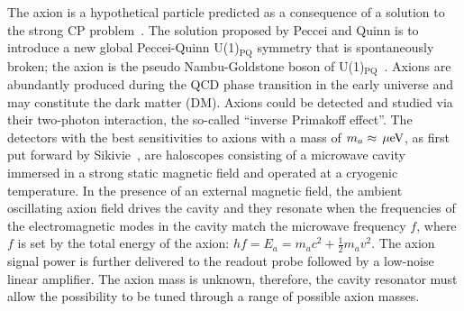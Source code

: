 \documentclass[%
 reprint,prl, %
 amsmath,amssymb,
 aps,
]{revtex4-2}
\newcommand{\ma}{\ensuremath{m_a}}
\newcommand{\muevcc}{\ensuremath{\,\mu\text{e\hspace{-.08em}V}}}
\begin{document}
The axion is a hypothetical particle predicted as a consequence of a  
solution to the strong CP problem~\cite{strongCPI,strongCPII,strongCPIII}. 
The solution proposed by Peccei and Quinn is to introduce a new global 
Peccei-Quinn U(1)$_\mathrm{PQ}$ symmetry that is spontaneously broken; the 
axion is the pseudo Nambu-Goldstone boson of 
U(1)$_\mathrm{PQ}$~\cite{strongCPI}. 
Axions are abundantly produced during the QCD phase transition in 
the early universe and may constitute the dark matter (DM). 
%
Axions could be detected and studied via their two-photon interaction, the
so-called ``inverse Primakoff effect''. 
The detectors with the best sensitivities to axions with a mass of 
$\ma\approx \muevcc$, as first put forward by 
Sikivie~\cite{SikivieI,SikivieII},  
are haloscopes consisting of a microwave cavity immersed in a strong static 
magnetic field and operated at a cryogenic temperature. 
In the presence of an external magnetic field, the ambient oscillating axion 
field drives the cavity and they resonate when the frequencies of the 
electromagnetic 
modes in the cavity match the microwave frequency $f$, where $f$ is set by 
the total energy of the axion: $hf=E_a=\ma c^2 + \frac{1}{2}\ma v^2$. The 
axion signal power is further delivered 
to the readout probe followed by a low-noise linear amplifier. 
The axion mass is unknown, therefore, 
the cavity resonator must allow the possibility to be tuned through a range
of possible axion masses. 
\end{document}
